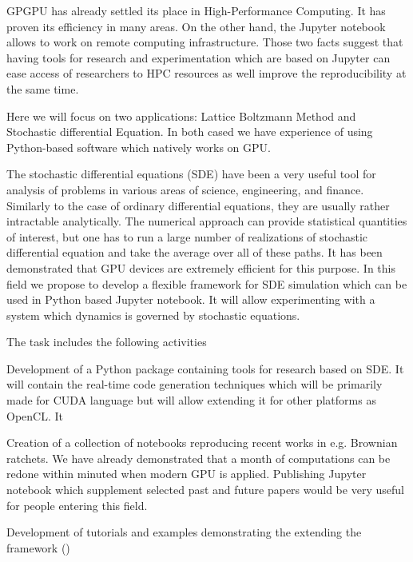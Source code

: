 \begin{task}[
  title=Application: Reproducible research based on GPU,
  id=application-gpu,
  lead=SIL,
  PM=12,
  wphases={0-48},
  partners={}
]


GPGPU  has already settled its place in High-Performance Computing. It has proven its efficiency in many areas. On the other hand,  the Jupyter notebook allows to work on remote computing infrastructure. Those two facts suggest that having tools for research and experimentation which are based on Jupyter can ease access of researchers  to HPC resources as well improve the  reproducibility at the same time. 

 Here we will focus on two applications: Lattice Boltzmann Method and Stochastic differential Equation. In both cased we have experience of using Python-based software which natively works on GPU. 

The stochastic differential equations (SDE) have been a very useful tool for analysis of problems
in various areas of science, engineering, and finance. Similarly to the case of ordinary differential equations, they are usually rather intractable analytically. The numerical approach can provide  statistical quantities of interest, but one has to run a large number of realizations of stochastic differential equation and take the average over all of these paths. It has been demonstrated that GPU devices are extremely efficient for this purpose. In this field we propose to develop a flexible framework for SDE simulation which can  be used in Python based Jupyter notebook. It will allow experimenting with a system which dynamics is governed by stochastic equations. 

  The task includes the following activities
  \begin{compactitem}
  \item Development of a Python package containing tools for research based on SDE. It will contain the real-time code generation techniques which will be primarily made for CUDA language but will allow extending it for other platforms as OpenCL. It 
  \item Creation of a collection of notebooks reproducing recent works in e.g. Brownian ratchets. We have already demonstrated \cite{januszewski2010accelerating,spiechowicz2015gpu} that a month of computations can be redone within minuted when modern GPU is applied. Publishing Jupyter notebook which supplement selected past and future papers would be very useful for people entering this field.  
  \item Development of tutorials and examples demonstrating the extending the framework
    ()
  \end{compactitem}
  

\end{task}
